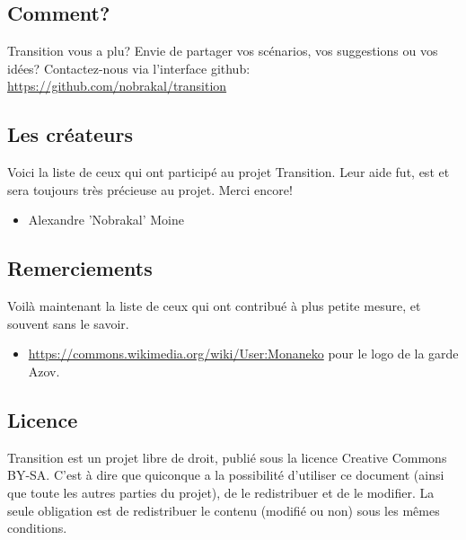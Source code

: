 \documentclass{book}
\begin{document}
\subsection{Comment?}
\hypertarget{participation}{}
Transition vous a plu? 
Envie de partager vos scénarios, vos suggestions ou vos idées?
\newline
Contactez-nous via l'interface github: \href {https://github.com/nobrakal/transition} {https://github.com/nobrakal/transition}
\subsection{Les créateurs}
Voici la liste de ceux qui ont participé au projet Transition. Leur aide fut, est et sera toujours très précieuse au projet. Merci encore!  
\begin{itemize}
\item Alexandre ’Nobrakal’ Moine 
\end{itemize}
\subsection{Remerciements}
Voilà maintenant la liste de ceux qui ont contribué à plus petite mesure, et souvent sans le savoir. 
\begin{itemize}
	\item \url{https://commons.wikimedia.org/wiki/User:Monaneko} pour le logo de la garde Azov.
\end{itemize}
\subsection{Licence}
Transition est un projet libre de droit, publié sous la licence Creative Commons BY-SA. C'est à dire que quiconque a la possibilité d'utiliser ce document (ainsi que toute les autres parties du projet), de le redistribuer et de le modifier. La seule obligation est de redistribuer le contenu (modifié ou non) sous les mêmes conditions.
\end{document}
